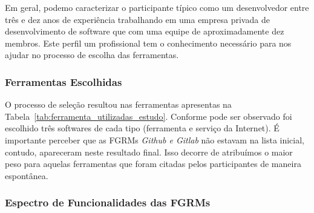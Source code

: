 Em geral, podemo caracterizar o participante típico como um desenvolvedor entre
três e dez anos de experiência trabalhando em uma empresa privada de
desenvolvimento de software que com uma equipe de aproximadamente dez membros.
Este perfil um profissional tem o conhecimento necessário para nos ajudar no
processo de escolha das ferramentas.

\subsubsection{Ferramentas Escolhidas}
\label{subsec:resultados_ferramentas_escolhidas}

O processo de seleção resultou nas ferramentas apresentas na
Tabela~\ref{tab:ferramenta_utilizadas_estudo}. Conforme pode ser observado foi
escolhido três softwares de cada tipo (ferramenta e serviço da Internet). É
importante perceber que as FGRMs \textit{Github e Gitlab} não estavam na lista
inicial, contudo, apareceram neste resultado final. Isso decorre  de atribuímos
o maior peso para aquelas ferramentas que foram citadas pelos participantes de
maneira espontânea.

\begin{table}[htpb]
\centering
{}
\caption{Ferramentas utilizados no estudo}
\label{tab:ferramenta_utilizadas_estudo}
\end{table}


\subsubsection{Espectro de Funcionalidades das FGRMs}
\label{subsec:categorizacao_ferramentas}

